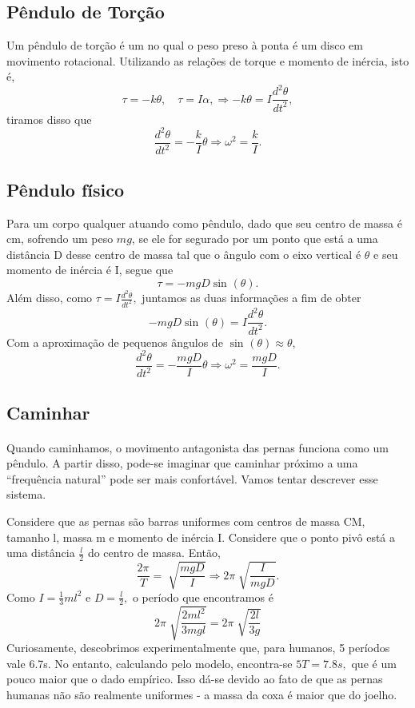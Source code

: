 \documentclass{article}
\begin{document}
\subsection{Pêndulo de Torção}
Um pêndulo de torção é um no qual o peso preso à ponta é um disco em movimento rotacional. Utilizando as relações de torque e momento de inércia, isto é, 
\[
  \tau = -k\theta, \quad \tau = I\alpha, \Rightarrow -k\theta = I \frac{d^{2}\theta }{dt^{2}},
\]
tiramos disso que 
\[
  \frac{d^{2}\theta }{dt^{2}} = - \frac{k}{I}\theta \Rightarrow \omega^{2} = \frac{k}{I}.
\]
\subsection{Pêndulo físico}
Para um corpo qualquer atuando como pêndulo, dado que seu centro de massa é cm, sofrendo um peso \(mg\), se ele for segurado por um ponto que está a uma distância
D desse centro de massa tal que o ângulo com o eixo vertical é \(\theta \) e seu momento de inércia é I, segue que 
\[
  \tau  = -mgD\sin^{}{(\theta )}.
\]
Além disso, como \(\tau = I \frac{d^{2}\theta }{dt^{2}},\) juntamos as duas informações a fim de obter 
\[
  -mgD\sin^{}{(\theta )} = I \frac{d^{2}\theta }{dt^{2}}.
\]
Com a aproximação de pequenos ângulos de \(\sin^{}{(\theta )}\approx \theta \), 
\[
  \frac{d^{2}\theta }{dt^{2}} = -\frac{mgD}{I}\theta \Rightarrow \omega^{2}= \frac{mgD}{I}.
\]
\subsection{Caminhar}
\paragraph{} Quando caminhamos, o movimento antagonista das pernas funciona como um pêndulo. A partir disso, pode-se imaginar que caminhar próximo
a uma ``frequência natural'' pode ser mais confortável. Vamos tentar descrever esse sistema.

Considere que as pernas são barras uniformes com centros de massa CM, tamanho l, massa m e momento de inércia I. Considere
que o ponto pivô está a uma distância \(\frac{l}{2}\) do centro de massa. Então, 
\[
  \frac{2\pi }{T} = \sqrt[]{\frac{mgD}{I}} \Rightarrow 2\pi \sqrt[]{\frac{I}{mgD}}.
\]
Como \(I = \frac{1}{3}ml^{2}\) e \(D = \frac{l}{2},\) o período que encontramos é 
\[
  2\pi \sqrt[]{\frac{2ml^{2}}{3mgl}} = 2\pi \sqrt[]{\frac{2l}{3g}}
\]
Curiosamente, descobrimos experimentalmente que, para humanos, 5 períodos vale 6.7s. No entanto,
calculando pelo modelo, encontra-se \(5T=7.8s,\) que é um pouco maior que o dado empírico. Isso dá-se 
devido ao fato de que as pernas humanas não são realmente uniformes - a massa da coxa é maior que do joelho.
\end{document}
